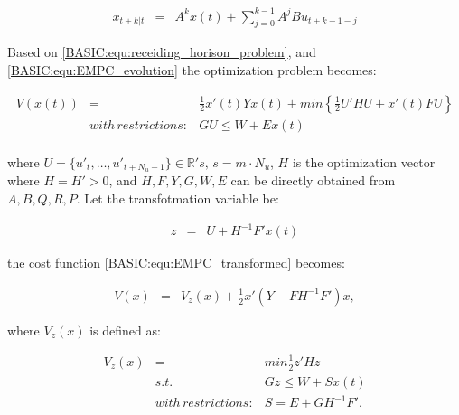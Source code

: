 \begin{equation}
        \begin{array}{rcl}
				x_{t+k|t}&=&A^kx(t)+\sum^{k-1}_{j=0}A^jBu_{t+k-1-j}
        \end{array}
        \label{BASIC:equ:EMPC_evolution}
    \end{equation}

Based on \ref{BASIC:equ:receiding_horison_problem}, and \ref{BASIC:equ:EMPC_evolution} the optimization problem becomes:

\begin{equation}
        \begin{array}{rcl}
				V(x(t))&=&\frac{1}{2}x'(t)Yx(t)+min\left\{\frac{1}{2}U'HU+x'(t)FU\right\}\\
				&with\,restrictions:&GU\leq W+Ex(t)\\
        \end{array}
        \label{BASIC:equ:EMPC_transformed}
    \end{equation}
		
		where $U=\{u'_t,\dots,u'_{t+N_u-1}\}\in\mathbb{R}'s,\,s=m\cdot N_u$, $H$ is the optimization vector where $H=H'>0$, and $H,F,Y,G,W,E$ can be directly obtained from $A,B,Q,R,P$. Let the transfotmation variable be:
		
		\begin{equation}
        \begin{array}{rcl}
				z&=&U+H^{-1}F'x(t)
        \end{array}
        \label{BASIC:equ:EMPC_trans_var}
    \end{equation}
		
		the cost function \ref{BASIC:equ:EMPC_transformed} becomes:
		
		\begin{equation}
        \begin{array}{rcl}
				V(x)&=&V_z(x)+\frac{1}{2}x'\left(Y-FH^{-1}F'\right)x,
        \end{array}
        \label{BASIC:equ:EMPC_trans_var}
    \end{equation}
		
		where $V_z(x)$ is defined as:
		
		\begin{equation}
        \begin{array}{rcl}
				V_z(x)&=&min\frac{1}{2}z'Hz\\
				&s.t.&Gz\leq W+Sx(t)\\
				&with\,restrictions:&S=E+GH^{-1}F'.\\
        \end{array}
        \label{BASIC:equ:EMPC_transformed}
    \end{equation}
		
